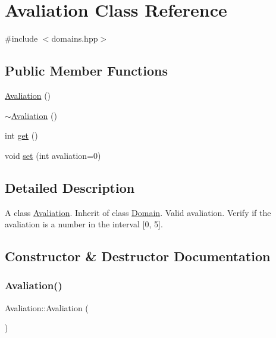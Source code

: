 \hypertarget{class_avaliation}{}\section{Avaliation Class Reference}
\label{class_avaliation}


{\ttfamily \#include $<$domains.\+hpp$>$}

\subsection*{Public Member Functions}
\begin{DoxyCompactItemize}
\item 
\hyperlink{class_avaliation_a216bb4d5149af7ad178eb13c936f9cb7}{Avaliation} ()
\item 
\hyperlink{class_avaliation_ab9045d4fcf4710c59ce9dac583cd247b}{$\sim$\+Avaliation} ()
\item 
int \hyperlink{class_avaliation_a49937ea0f69532de8b317737d54e43e6}{get} ()
\item 
void \hyperlink{class_avaliation_a00b84775eb2dc916d98f9e6cd6678cd3}{set} (int avaliation=0)
\end{DoxyCompactItemize}


\subsection{Detailed Description}
A class \hyperlink{class_avaliation}{Avaliation}. Inherit of class \hyperlink{class_domain}{Domain}. Valid avaliation. Verify if the avaliation is a number in the interval \mbox{[}0, 5\mbox{]}. 

\subsection{Constructor \& Destructor Documentation}
\mbox{\label{class_avaliation_a216bb4d5149af7ad178eb13c936f9cb7}} 
\subsubsection{\texorpdfstring{Avaliation()}{Avaliation()}}
{\footnotesize\ttfamily Avaliation\+::\+Avaliation (\begin{DoxyParamCaption}{ }\end{DoxyParamCaption})}

